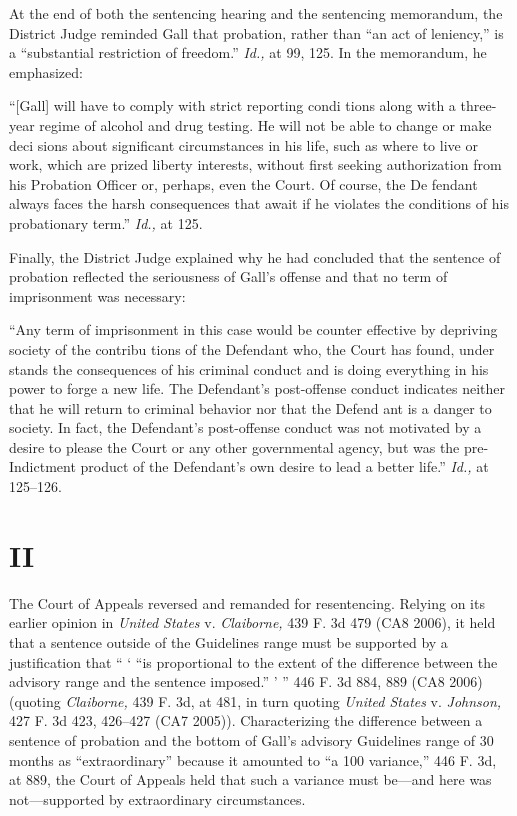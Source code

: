   At the end of both the sentencing hearing and the sentencing
memorandum, the District Judge reminded Gall that probation, rather than
``an act of leniency,'' is a ``substantial restriction of freedom.''
\emph{Id.,} at 99, 125. In the memorandum, he emphasized:

    ``[Gall] will have to comply with strict reporting condi tions
    along with a three-year regime of alcohol and drug testing. He
    will not be able to change or make deci sions about significant
    circumstances in his life, such as where to live or work, which are
    prized liberty interests, without first seeking authorization from
    his Probation Officer or, perhaps, even the Court. Of course, the
    De fendant always faces the harsh consequences that await if he
    violates the conditions of his probationary term.'' \emph{Id.,} at
    125.

  Finally, the District Judge explained why he had concluded that the
sentence of probation reflected the seriousness of Gall's offense and
that no term of imprisonment was necessary:

      ``Any term of imprisonment in this case would be counter
effective by depriving society of the contribu tions of the Defendant
who, the Court has found, under stands the consequences of his criminal
conduct and is doing everything in his power to forge a new life. The
Defendant's post-offense conduct indicates neither that he will return
to criminal behavior nor that the Defend ant is a danger to society. In
fact, the Defendant's \newpage  post-offense conduct was not motivated
by a desire to please the Court or any other governmental agency, but
was the pre-Indictment product of the Defendant's own desire to lead a
better life.'' \emph{Id.,} at 125--126.

\section{II}

  The Court of Appeals reversed and remanded for resentencing. Relying
on its earlier opinion in \emph{United States} v. \emph{Claiborne,}
439 F. 3d 479 (CA8 2006), it held that a sentence outside of the
Guidelines range must be supported by a justification that `` ‘
``is proportional to the extent of the difference between the advisory
range and the sentence imposed.'' ' '' 446 F. 3d 884, 889 (CA8
2006) (quoting \emph{Claiborne,} 439 F. 3d, at 481, in turn quoting
\emph{United States} v. \emph{Johnson,} 427 F. 3d 423, 426--427 (CA7
2005)). Characterizing the difference between a sentence of probation
and the bottom of Gall's advisory Guidelines range of 30 months
as ``extraordinary'' because it amounted to ``a 100%
variance,'' 446 F. 3d, at 889, the Court of Appeals held that such
a variance must be---and here was not---supported by extraordinary
circumstances.

